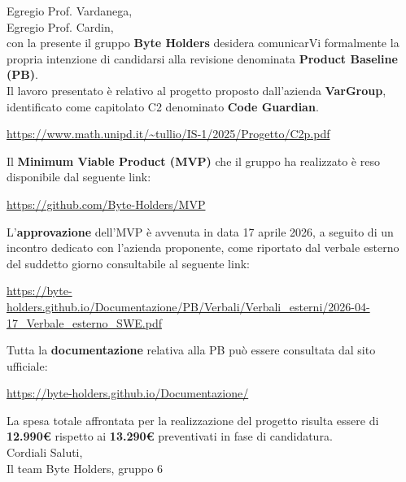 \documentclass[a4paper, 12pt]{article}
\begin{document}
\newpage
\large \noindent Egregio Prof. Vardanega,\\
Egregio Prof. Cardin,\\[1cm]
\noindent con la presente il gruppo \textbf{Byte Holders} desidera comunicarVi formalmente la propria intenzione di candidarsi alla revisione denominata \textbf{Product Baseline (PB)}.\\ Il lavoro presentato è relativo al progetto proposto dall'azienda \textbf{VarGroup}, identificato come capitolato C2 denominato \textbf{Code Guardian}.
\vspace{0.3cm}
\begin{center}
    \url{https://www.math.unipd.it/~tullio/IS-1/2025/Progetto/C2p.pdf}
\end{center}
\vspace{0.3cm}
Il \textbf{Minimum Viable Product (MVP)} che il gruppo ha realizzato è reso disponibile dal seguente link:
\vspace{0.3cm}
\begin{center}
    \url{https://github.com/Byte-Holders/MVP}
\end{center}
\vspace{0.3cm}
L'\textbf{approvazione} dell'MVP è avvenuta in data 17 aprile 2026, a seguito di un incontro dedicato con l'azienda proponente, come riportato dal verbale esterno del suddetto giorno consultabile al seguente link:
\vspace{0.3cm}
\begin{center}
    \url{https://byte-holders.github.io/Documentazione/PB/Verbali/Verbali_esterni/2026-04-17_Verbale_esterno_SWE.pdf}
\end{center}
\vspace{0.3cm}
Tutta la \textbf{documentazione} relativa alla PB può essere consultata dal sito ufficiale:
\vspace{0.3cm}
\begin{center}
    \url{https://byte-holders.github.io/Documentazione/}
\end{center}
\vspace{0.3cm}

\noindent
La spesa totale affrontata per la realizzazione del progetto risulta essere di \textbf{12.990€} rispetto ai \textbf{13.290€} preventivati in fase di candidatura.\\[0.5cm]

\noindent
Cordiali Saluti,\\
Il team Byte Holders, gruppo 6
\end{document}
